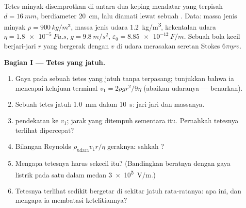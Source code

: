 \begin{problem}
\label{pb:b1:potential-capacitors:1}
Tetes minyak disemprotkan di antara dua keping mendatar yang terpisah $d = \qty{16}{mm}$,
berdiameter \qty{20}{cm}, lalu diamati lewat sebuah .
Data: massa jenis minyak $\rho = \qty{900}{kg/m^3}$, massa jenis udara
\qty{1.2}{kg/m^3}, kekentalan udara $\eta = \qty{1.8e-5}{Pa.s}$, $g =
\qty{9.8}{m/s^2}$, $\varepsilon_0 = \qty{8.85e-12}{F/m}$. Sebuah bola kecil
berjari-jari $r$ yang bergerak dengan $v$ di udara merasakan seretan Stokes $6\pi\eta rv$.

\medskip
\noindent\textbf{Bagian I --- Tetes yang jatuh.}
\begin{enumerate}
  \item Gaya pada sebuah tetes yang jatuh tanpa  terpasang; tunjukkan
        bahwa ia mencapai kelajuan terminal $v_1 = 2\rho gr^2/9\eta$ (abaikan
         udaranya --- benarkan).
  \item Sebuah tetes jatuh \qty{1.0}{mm} dalam \qty{10}{s}: jari-jari dan massanya.
  \item {} pendekatan ke $v_1$; jarak yang ditempuh
        sementara itu. Pernahkah tetesnya terlihat dipercepat?
  \item Bilangan Reynolds $\rho_{\text{udara}}v_1r/\eta$ geraknya: sahkah
        ?
  \item Mengapa tetesnya harus sekecil itu? (Bandingkan beratnya dengan
        gaya listrik pada satu  dalam medan
        \qty{3e5}{V/m}.)
  \item Tetesnya terlihat sedikit bergetar di sekitar jatuh rata-ratanya: apa
        ini, dan mengapa ia membatasi ketelitiannya?
\end{enumerate}


\end{problem}
